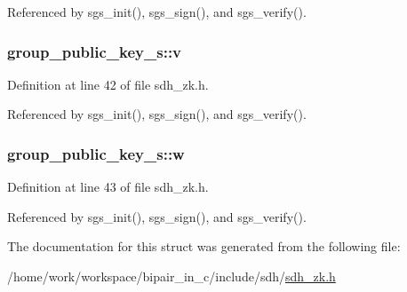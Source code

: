 Referenced by sgs\-\_\-init(), sgs\-\_\-sign(), and sgs\-\_\-verify().

\hypertarget{structgroup__public__key__s_a1f7c91c70559dd48762edce94bab9dfd}{
\subsubsection[{v}]{ group\-\_\-public\-\_\-key\-\_\-s\-::v}}\label{structgroup__public__key__s_a1f7c91c70559dd48762edce94bab9dfd}


Definition at line 42 of file sdh\-\_\-zk.\-h.



Referenced by sgs\-\_\-init(), sgs\-\_\-sign(), and sgs\-\_\-verify().

\hypertarget{structgroup__public__key__s_aca44fbfefe4770940dfd03a6fb1a365f}{
\subsubsection[{w}]{ group\-\_\-public\-\_\-key\-\_\-s\-::w}}\label{structgroup__public__key__s_aca44fbfefe4770940dfd03a6fb1a365f}


Definition at line 43 of file sdh\-\_\-zk.\-h.



Referenced by sgs\-\_\-init(), sgs\-\_\-sign(), and sgs\-\_\-verify().



The documentation for this struct was generated from the following file\-:\begin{DoxyCompactItemize}
\item 
/home/work/workspace/bipair\-\_\-in\-\_\-c/include/sdh/\hyperlink{sdh__zk_8h}{sdh\-\_\-zk.\-h}\end{DoxyCompactItemize}
